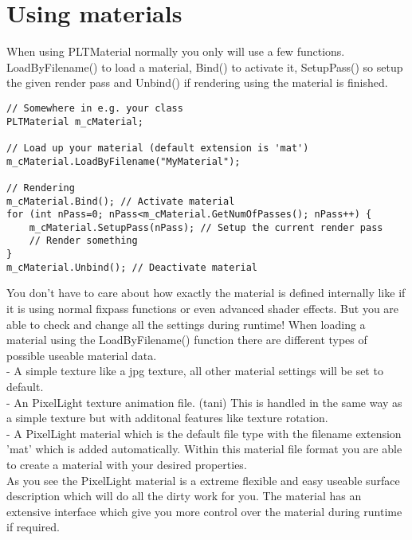 \section{Using materials}
When using PLTMaterial normally you only will use a few functions. LoadByFilename() to load a material,
Bind() to activate it, SetupPass() so setup the given render pass and Unbind() if rendering using the
material is finished.\\

\begin{lstlisting}[caption=Using materials]
// Somewhere in e.g. your class
PLTMaterial m_cMaterial;

// Load up your material (default extension is 'mat')
m_cMaterial.LoadByFilename("MyMaterial");

// Rendering
m_cMaterial.Bind(); // Activate material
for (int nPass=0; nPass<m_cMaterial.GetNumOfPasses(); nPass++) {
	m_cMaterial.SetupPass(nPass); // Setup the current render pass
	// Render something
}
m_cMaterial.Unbind(); // Deactivate material
\end{lstlisting}

You don't have to care about how exactly the material is defined internally like if it is using
normal fixpass functions or even advanced shader effects. But you are able to check and change all
the settings during runtime!
When loading a material using the LoadByFilename() function there are different types of possible useable
material data.\\
- A simple texture like a jpg texture, all other material settings will be set to default.\\
- An PixelLight texture animation file. (tani) This is handled in the same way as a simple texture
  but with additonal features like texture rotation.\\
- A PixelLight material which is the default file type with the filename extension 'mat' which is
  added automatically. Within this material file format you are able to create a material with your
  desired properties.\\

As you see the PixelLight material is a extreme flexible and easy useable surface description which will do
all the dirty work for you. The material has an extensive interface which give you more control
over the material during runtime if required.




